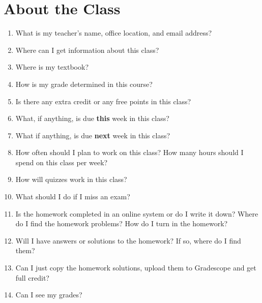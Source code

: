 \documentclass[12pt,fleqn]{article}
\begin{document}
\section{About the Class}
\begin{enumerate}
\item What is my teacher's name, office location, and email address?

\vfill


\item Where can I get information about this class?\\


\vfill
\item Where is my textbook?\\

\vfill
\item How is my grade determined in this course? \\

\vfill
\item Is there any extra credit or any free points in this class?\\

\vfill
\item What, if anything, is due \textbf{this} week in this class? \\
\vfill
\item What if anything, is due \textbf{next} week in this class? \\
\vfill
\newpage
\item How often should I plan to work on this class? How many hours should I spend on this class per week?

\vfill
\item How will quizzes work in this class?
\vfill

\item What should I do if I miss an exam?

\vfill

\item Is the homework completed in an online system or do I write it down? Where do I find the homework problems? How do I turn in the homework?
\vfill
\item Will I have answers or solutions to the homework? If so, where do I find them?\\
\vfill
\item Can I just copy the homework solutions, upload them to Gradescope and get full credit? \\
\vfill
\item Can I see my grades?\\
\vfill


\end{enumerate}
\end{document}
